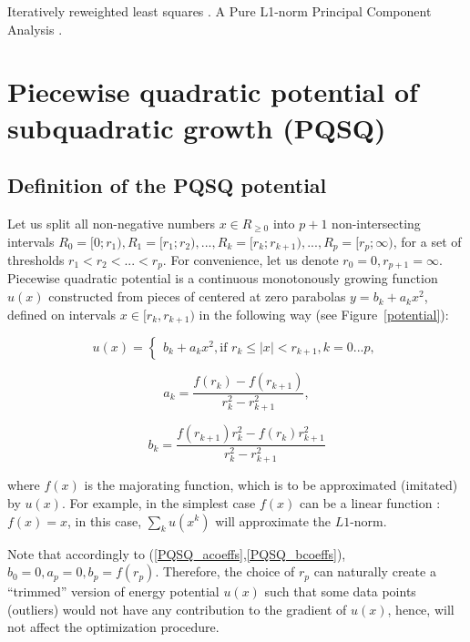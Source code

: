 \documentclass[preprint,12pt]{elsarticle}
\begin{document}
Iteratively reweighted least squares \cite{Lu2015}. A Pure L1-norm Principal Component Analysis \cite{Brooks2013}.

\section{Piecewise quadratic potential of subquadratic growth (PQSQ)}
\label{S:2}

\subsection{Definition of the PQSQ potential}

Let us split all non-negative numbers $x\in R_{\geq 0}$ into $p+1$ non-intersecting intervals $R_0=[0;r_1), R_1=[r_1;r_2), ... , R_k=[r_k;r_{k+1}), ..., R_p=[r_p;\infty)$,  for a set of thresholds $r_1<r_2<...<r_p$. For convenience, let us denote $r_0=0, r_{p+1} = \infty$. Piecewise quadratic potential is a continuous monotonously growing function $u(x)$ constructed from pieces of centered at zero parabolas $y=b_k+a_kx^2$, defined on intervals $x\in[r_k,r_{k+1})$ in the following way (see Figure~\ref{potential}):

\begin{equation}\label{PQSQ_f}
u(x)=
\begin{cases}
b_k+a_kx^2, \mbox{if } r_k \leq |x|<r_{k+1}, k=0...p,
\end{cases}
\end{equation}

\begin{equation}\label{PQSQ_acoeffs}
a_k = \frac{f(r_k)-f(r_{k+1})}{r_k^2-r_{k+1}^2},
\end{equation}

\begin{equation}\label{PQSQ_bcoeffs}
b_k = \frac{f(r_{k+1})r_k^2-f(r_{k})r_{k+1}^2}{r_k^2-r_{k+1}^2}
\end{equation}

\noindent where $f(x)$ is the majorating function, which is to be approximated (imitated) by $u(x)$. For example, in the simplest case $f(x)$ can be a linear function : $f(x)=x$, in this case, $\sum_k u(x^k)$ will approximate the $L1$-norm.

Note that accordingly to (\ref{PQSQ_acoeffs},\ref{PQSQ_bcoeffs}), $b_0=0, a_p=0, b_p=f(r_p)$. Therefore, the choice of $r_p$ can naturally create a ``trimmed'' version of energy potential $u(x)$ such that some data points (outliers) would not have any contribution to the gradient of $u(x)$, hence, will not affect the optimization procedure.
\end{document}
